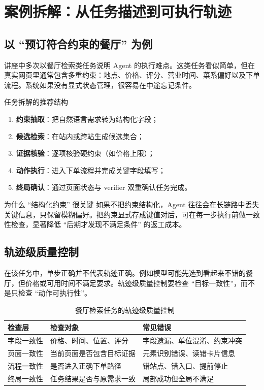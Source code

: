 \section{案例拆解：从任务描述到可执行轨迹}

\subsection{以 ``预订符合约束的餐厅'' 为例}
讲座中多次以餐厅检索类任务说明 Agent 的执行难点。这类任务看似简单，但在真实网页里通常包含多重约束：地点、价格、评分、营业时间、菜系偏好以及下单流程。系统如果没有显式状态管理，很容易在中途忘记条件。

\begin{importantbox}{任务拆解的推荐结构}
\begin{enumerate}
    \item \textbf{约束抽取}：把自然语言需求转为结构化字段；
    \item \textbf{候选检索}：在站内或跨站生成候选集合；
    \item \textbf{证据核验}：逐项核验硬约束（如价格上限）；
    \item \textbf{动作执行}：进入下单流程并完成关键字段填写；
    \item \textbf{终局确认}：通过页面状态与 verifier 双重确认任务完成。
\end{enumerate}
\end{importantbox}

\begin{knowledgebox}{为什么 ``结构化约束'' 很关键}
如果不把约束结构化，Agent 往往会在长链路中丢失关键信息，只保留模糊偏好。把约束显式存成键值对后，可在每一步执行前做一致性检查，显著降低 ``后期才发现不满足条件'' 的返工成本。
\end{knowledgebox}

\subsection{轨迹级质量控制}
在该任务中，单步正确并不代表轨迹正确。例如模型可能先选到看起来不错的餐厅，但价格或可用时间不满足要求。轨迹级质量控制要检查 ``目标一致性''，而不是只检查 ``动作可执行性''。

\begin{table}[H]
\centering
\small
\begin{tabular}{p{2.8cm}p{3.5cm}p{4.4cm}}
\toprule
\textbf{检查层} & \textbf{检查对象} & \textbf{常见错误} \\
\midrule
字段一致性 & 价格、时间、位置、评分 & 字段遗漏、单位混淆、约束冲突 \\
页面一致性 & 当前页面是否包含目标证据 & 元素识别错误、读错卡片信息 \\
流程一致性 & 是否进入正确下单路径 & 错站点、错入口、提前停止 \\
终局一致性 & 任务结果是否与原需求一致 & 局部成功但全局不满足 \\
\bottomrule
\end{tabular}
\caption{餐厅检索任务的轨迹级质量控制}
\end{table}

